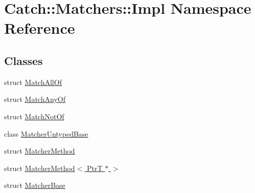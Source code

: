 \hypertarget{namespaceCatch_1_1Matchers_1_1Impl}{\section{Catch\-:\-:Matchers\-:\-:Impl Namespace Reference}
\label{namespaceCatch_1_1Matchers_1_1Impl}
}
\subsection*{Classes}
\begin{DoxyCompactItemize}
\item 
struct \hyperlink{structCatch_1_1Matchers_1_1Impl_1_1MatchAllOf}{Match\-All\-Of}
\item 
struct \hyperlink{structCatch_1_1Matchers_1_1Impl_1_1MatchAnyOf}{Match\-Any\-Of}
\item 
struct \hyperlink{structCatch_1_1Matchers_1_1Impl_1_1MatchNotOf}{Match\-Not\-Of}
\item 
class \hyperlink{classCatch_1_1Matchers_1_1Impl_1_1MatcherUntypedBase}{Matcher\-Untyped\-Base}
\item 
struct \hyperlink{structCatch_1_1Matchers_1_1Impl_1_1MatcherMethod}{Matcher\-Method}
\item 
struct \hyperlink{structCatch_1_1Matchers_1_1Impl_1_1MatcherMethod_3_01PtrT_01_5_01_4}{Matcher\-Method$<$ Ptr\-T $\ast$ $>$}
\item 
struct \hyperlink{structCatch_1_1Matchers_1_1Impl_1_1MatcherBase}{Matcher\-Base}
\end{DoxyCompactItemize}
